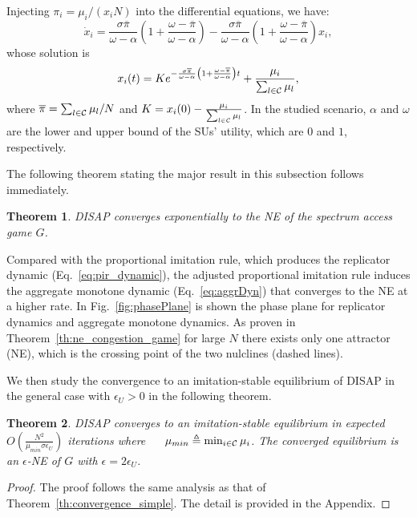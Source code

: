 \documentclass[12pt, onecolumn]{IEEEtran}
\theoremstyle{plain}
\newtheorem{theorem}{Theorem}
\theoremstyle{definition}
\begin{document}
Injecting $\pi_i=\mu_i/(x_iN)$ into the differential equations, we have:
\begin{equation*}
\dot x_i = \frac{\sigma\overline{\pi}}{\omega-\alpha}\left(1+\frac{\omega-\overline{\pi}}{\omega-\alpha}\right)-\frac{\sigma\overline{\pi}}{\omega-\alpha}\left(1+\frac{\omega-\overline{\pi}}{\omega-\alpha}\right)x_i,
\end{equation*}
whose solution is
\begin{equation}
x_i(t) = Ke^{-\frac{\sigma\overline{\pi}}{\omega-\alpha}\left(1+\frac{\omega-\overline{\pi}}{\omega-\alpha}\right)t}+\frac{\mu_i}{\sum_{l\in {\cal C}} \mu_l},
\label{eq:di_x}
\end{equation}
where $\overline{\pi}=\sum_{l\in {\cal C}} \mu_l/N$ and
$K = x_i(0)-\frac{\mu_i}{\sum_{l\in {\cal C}} \mu_l}$. In the studied scenario, $\alpha$ and $\omega$ are the lower and upper bound of the SUs' utility, which are $0$ and $1$, respectively.

The following theorem stating the major result in this subsection follows immediately.

\begin{theorem}
DISAP converges exponentially to the NE of the spectrum access game $G$.
\end{theorem}

Compared with the proportional imitation rule, which produces the replicator dynamic (Eq.~\eqref{eq:pir_dynamic}), the adjusted proportional imitation rule induces the aggregate monotone
dynamic (Eq.~\eqref{eq:aggrDyn}) that converges to the NE at a higher rate. In Fig.~\ref{fig:phasePlane} is shown the phase plane for replicator dynamics and aggregate monotone dynamics. As proven in Theorem~\ref{th:ne_congestion_game}
for large $N$ there exists only one attractor (NE), which is the crossing point of the two nulclines (dashed lines).



We then study the convergence to an imitation-stable equilibrium of DISAP in the general case with $\epsilon_U>0$ in the following theorem.

\begin{theorem}
\label{th:convergence_double}
DISAP converges to an imitation-stable equilibrium in expected $O(\frac{N^2}{\mu_{min}\sigma\epsilon_U})$ iterations where $\quad$ $\mu_{min}\triangleq  \min_{i \in {\cal C}} \mu_i$. The converged equilibrium is an $\epsilon$-NE of $G$ with $\epsilon=2\epsilon_U$.
\end{theorem}

\begin{proof}
The proof follows the same analysis as that of Theorem~\ref{th:convergence_simple}. The detail is provided in the Appendix.
\end{proof}
\end{document}
